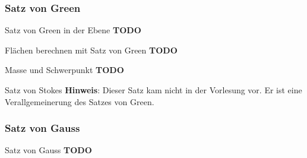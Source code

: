 \subsubsection{Satz von Green}

\begin{Satz}{Satz von Green in der Ebene}{}
	\textbf{TODO}	
\end{Satz}

\begin{Rezept}{Flächen berechnen mit Satz von Green}{}
	\textbf{TODO}	
\end{Rezept}

\begin{Satz}{Masse und Schwerpunkt}{}
	\textbf{TODO}	
\end{Satz}

\begin{Satz}{Satz von Stokes}{}
	\textbf{Hinweis}: Dieser Satz kam nicht in der Vorlesung vor. Er ist eine Verallgemeinerung des Satzes von Green.	
\end{Satz}

\subsubsection{Satz von Gauss}

\begin{Satz}{Satz von Gauss}{}
	\textbf{TODO}	
\end{Satz}


